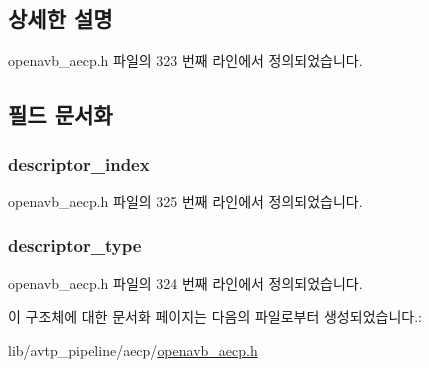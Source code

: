 \subsection{상세한 설명}


openavb\+\_\+aecp.\+h 파일의 323 번째 라인에서 정의되었습니다.



\subsection{필드 문서화}
\subsubsection[{\texorpdfstring{descriptor\+\_\+index}{descriptor_index}}]{ descriptor\+\_\+index}\hypertarget{structopenavb__aecp__commandresponse__data__stop__streaming__t_ab26fb363c24b9a2a4391f9171c981b08}{}\label{structopenavb__aecp__commandresponse__data__stop__streaming__t_ab26fb363c24b9a2a4391f9171c981b08}


openavb\+\_\+aecp.\+h 파일의 325 번째 라인에서 정의되었습니다.

\subsubsection[{\texorpdfstring{descriptor\+\_\+type}{descriptor_type}}]{ descriptor\+\_\+type}\hypertarget{structopenavb__aecp__commandresponse__data__stop__streaming__t_a1e231d7874aada5925b29affc76782cc}{}\label{structopenavb__aecp__commandresponse__data__stop__streaming__t_a1e231d7874aada5925b29affc76782cc}


openavb\+\_\+aecp.\+h 파일의 324 번째 라인에서 정의되었습니다.



이 구조체에 대한 문서화 페이지는 다음의 파일로부터 생성되었습니다.\+:\begin{DoxyCompactItemize}
\item 
lib/avtp\+\_\+pipeline/aecp/\hyperlink{openavb__aecp_8h}{openavb\+\_\+aecp.\+h}\end{DoxyCompactItemize}
